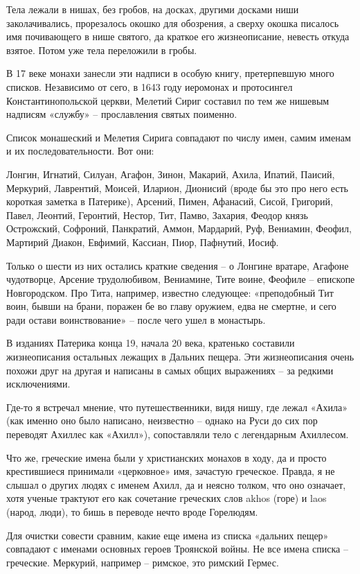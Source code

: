 Тела лежали в нишах, без гробов, на досках, другими досками ниши заколачивались, прорезалось окошко для обозрения, а сверху окошка писалось имя почивающего в нише святого, да краткое его жизнеописание, невесть откуда взятое. Потом уже тела переложили в гробы.

В 17 веке монахи занесли эти надписи в особую книгу, претерпевшую много списков. Независимо от сего, в 1643 году иеромонах и протосингел Константинопольской церкви, Мелетий Сириг составил по тем же нишевым надписям «службу» – прославления святых поименно.

Список монашеский и Мелетия Сирига совпадают по числу имен, самим именам и их последовательности. Вот они:

Лонгин, Игнатий, Силуан, Агафон, Зинон, Макарий, Ахила, Ипатий, Паисий, Меркурий, Лаврентий, Моисей, Иларион, Дионисий (вроде бы это про него есть короткая заметка в Патерике), Арсений, Пимен, Афанасий, Сисой, Григорий, Павел, Леонтий, Геронтий, Нестор, Тит, Памво, Захария, Феодор князь Острожский, Софроний, Панкратий, Аммон, Мардарий, Руф, Вениамин, Феофил, Мартирий Диакон, Евфимий, Кассиан, Пиор, Пафнутий, Иосиф. 

Только о шести из них остались краткие сведения – о Лонгине вратаре, Агафоне чудотворце, Арсение трудолюбивом, Вениамине, Тите воине, Феофиле – епископе Новгородском. Про Тита, например, известно следующее: «преподобный Тит воин, бывши на брани, поражен бе во главу оружием, едва не смертне, и сего ради остави воинствование» – после чего ушел в монастырь.

В изданиях Патерика конца 19, начала 20 века, кратенько составили жизнеописания остальных лежащих в Дальних пещера. Эти жизнеописания очень похожи друг на другая и написаны в самых общих выражениях – за редкими исключениями.

Где-то я встречал мнение, что путешественники, видя нишу, где лежал «Ахила» (как именно оно было написано, неизвестно – однако на Руси до сих пор переводят Ахиллес как «Ахилл»), сопоставляли тело с легендарным Ахиллесом.

Что же, греческие имена были у христианских монахов в ходу, да и просто крестившиеся принимали «церковное» имя, зачастую греческое. Правда, я не слышал о других людях с именем Ахилл, да и неясно толком, что оно означает, хотя ученые трактуют его как сочетание греческих слов akhos (горе) и laos (народ, люди), то бишь в переводе нечто вроде Горелюдям.

Для очистки совести сравним, какие еще имена из списка «дальних пещер» совпадают с именами основных героев Троянской войны. Не все имена списка – греческие. Меркурий, например – римское, это римский Гермес. 

